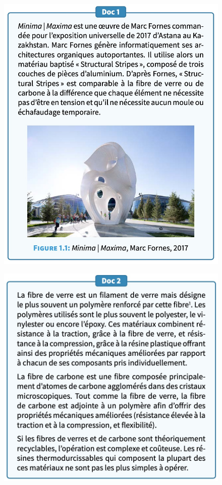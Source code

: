 \documentclass{exam}
\begin{document}
\begin{minipage}[c]{0.45\linewidth}
  \begin{figure}[H]
    \centering
    \includegraphics[width=0.9\linewidth]{dst1_fig1.jpg}
  \end{figure}

  \begin{figure}[H]
    \centering
    \includegraphics[width=0.9\linewidth]{dst1_fig2.jpg}
  \end{figure}
  
  \end{minipage} 
\end{document}
